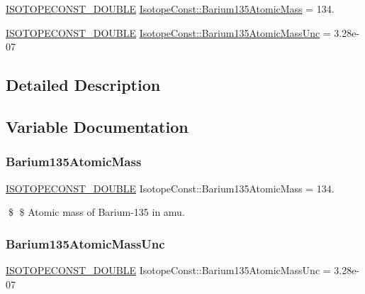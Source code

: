 \begin{DoxyCompactItemize}
\item 
\mbox{\hyperlink{group___isotope_const-_macros_ga8f45a7272ce02c0b4c65c44636ed719a}{I\+S\+O\+T\+O\+P\+E\+C\+O\+N\+S\+T\+\_\+\+D\+O\+U\+B\+LE}} \mbox{\hyperlink{group___isotope_const-_barium-_ba135_ga377a832fd266e4c0a8154a14d54f5c8e}{Isotope\+Const\+::\+Barium135\+Atomic\+Mass}} = 134.
\item 
\mbox{\hyperlink{group___isotope_const-_macros_ga8f45a7272ce02c0b4c65c44636ed719a}{I\+S\+O\+T\+O\+P\+E\+C\+O\+N\+S\+T\+\_\+\+D\+O\+U\+B\+LE}} \mbox{\hyperlink{group___isotope_const-_barium-_ba135_gaa03f1172df0071c3b2f4d4a884479be0}{Isotope\+Const\+::\+Barium135\+Atomic\+Mass\+Unc}} = 3.\+28e-\/07
\end{DoxyCompactItemize}


\subsection{Detailed Description}


\subsection{Variable Documentation}
\mbox{\label{group___isotope_const-_barium-_ba135_ga377a832fd266e4c0a8154a14d54f5c8e}} 
\subsubsection{\texorpdfstring{Barium135\+Atomic\+Mass}{Barium135AtomicMass}}
{\footnotesize\ttfamily \mbox{\hyperlink{group___isotope_const-_macros_ga8f45a7272ce02c0b4c65c44636ed719a}{I\+S\+O\+T\+O\+P\+E\+C\+O\+N\+S\+T\+\_\+\+D\+O\+U\+B\+LE}} Isotope\+Const\+::\+Barium135\+Atomic\+Mass = 134.}

\$ \$ Atomic mass of Barium-\/135 in amu. \mbox{\label{group___isotope_const-_barium-_ba135_gaa03f1172df0071c3b2f4d4a884479be0}} 
\subsubsection{\texorpdfstring{Barium135\+Atomic\+Mass\+Unc}{Barium135AtomicMassUnc}}
{\footnotesize\ttfamily \mbox{\hyperlink{group___isotope_const-_macros_ga8f45a7272ce02c0b4c65c44636ed719a}{I\+S\+O\+T\+O\+P\+E\+C\+O\+N\+S\+T\+\_\+\+D\+O\+U\+B\+LE}} Isotope\+Const\+::\+Barium135\+Atomic\+Mass\+Unc = 3.\+28e-\/07}

